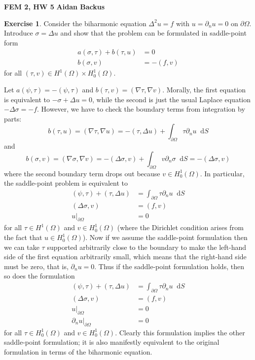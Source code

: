 \documentclass[10pt]{article}
\newcommand*\dif{\mathop{}\!\mathrm{d}}
\theoremstyle{definition}
\newtheorem{exer}{Exercise}
\begin{document}
\noindent
\large\textbf{FEM 2, HW 5} \hfill \textbf{Aidan Backus} \\

\begin{exer}
    Consider the biharmonic equation $\Delta^2 u = f$ with $u = \partial_n u = 0$ on $\partial \Omega$.
    Introduce $\sigma = \Delta u$ and show that the problem can be formulated in saddle-point form
\begin{align*}
    a(\sigma, \tau) + b(\tau, u) &= 0 \\
    b(\sigma, v) &= -(f, v)
\end{align*}
    for all $(\tau, v) \in H^1(\Omega) \times H^1_0(\Omega)$.
\end{exer}

Let $a(\psi, \tau) = -(\psi, \tau)$ and $b(\tau, v) = (\nabla \tau, \nabla v)$.
Morally, the first equation is equivalent to $-\sigma + \Delta u = 0$, while the second is just the usual Laplace equation $-\Delta \sigma = -f$.
However, we have to check the boundary terms from integration by parts:
$$b(\tau, u) = (\nabla \tau, \nabla u) = -(\tau, \Delta u) + \int_{\partial \Omega} \tau \partial_n u \dif S$$
and 
$$b(\sigma, v) = (\nabla \sigma, \nabla v) = -(\Delta \sigma, v) + \int_{\partial \Omega} v \partial_n \sigma \dif S = -(\Delta \sigma, v)$$
where the second boundary term drops out because $v \in H^1_0(\Omega)$.
In particular, the saddle-point problem is equivalent to
\begin{align*}
(\psi, \tau) + (\tau, \Delta u) &= \int_{\partial \Omega} \tau \partial_n u \dif S \\
(\Delta \sigma, v) &= (f, v) \\
u|_{\partial \Omega} &= 0
\end{align*}
for all $\tau \in H^1(\Omega)$ and $v \in H^1_0(\Omega)$ (where the Dirichlet condition arises from the fact that $u \in H^1_0(\Omega)$).
Now if we assume the saddle-point formulation then we can take $\tau$ supported arbitrarily close to the boundary to make the left-hand side of the first equation arbitrarily small, which means that the right-hand side must be zero, that is, $\partial_n u = 0$.
Thus if the saddle-point formulation holds, then so does the formulation 
\begin{align*}
(\psi, \tau) + (\tau, \Delta u) &= \int_{\partial \Omega} \tau \partial_n u \dif S \\
(\Delta \sigma, v) &= (f, v) \\
u|_{\partial \Omega} &= 0\\
\partial_n u|_{\partial \Omega} &= 0
\end{align*}
for all $\tau \in H^1_0(\Omega)$ and $v \in H^1_0(\Omega)$.
Clearly this formulation implies the other saddle-point formulation; it is also manifestly equivalent to the original formulation in terms of the biharmonic equation.
\end{document}
